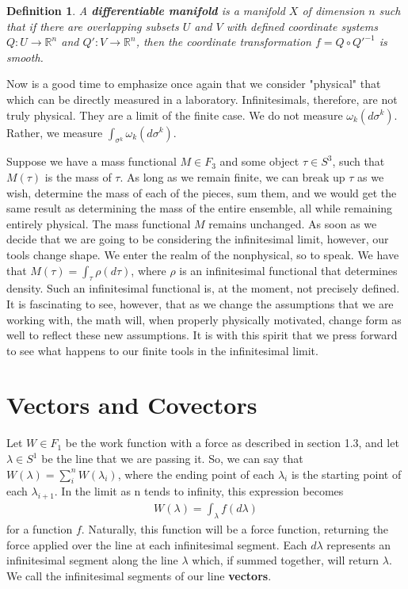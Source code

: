\documentclass{book}
\newtheorem{defn}[equation]{Definition}
\begin{document}
\begin{defn}
	A \textbf{differentiable manifold} is a manifold $X$ of dimension $n$ such that if there are overlapping subsets $U$ and $V$ with defined coordinate systems $Q: U \to \mathbb{R}^n$ and $Q': V \to \mathbb{R}^n$, then the coordinate transformation $f = Q \circ Q'^{-1}$ is smooth. 
\end{defn}

Now is a good time to emphasize once again that we consider "physical" that which can be directly measured in a laboratory. Infinitesimals, therefore, are not truly physical. They are a limit of the finite case. We do not measure $\omega_k(d\sigma^k)$. Rather, we measure $\int_{\sigma^k}\omega_k(d\sigma^k)$. 

Suppose we have a mass functional $M \in F_3$ and some object $\tau \in S^3$, such that $M(\tau)$ is the mass of $\tau$.  As long as we remain finite, we can break up $\tau$ as we wish, determine the mass of each of the pieces, sum them, and we would get the same result as determining the mass of the entire ensemble, all while remaining entirely physical. The mass functional $M$ remains unchanged. As soon as we decide that we are going to be considering the infinitesimal limit, however, our tools change shape. We enter the realm of the nonphysical, so to speak. We have that $M(\tau) = \int_\tau \rho(d\tau)$, where $\rho$ is an infinitesimal functional that determines density. Such an infinitesimal functional is, at the moment, not precisely defined. It is fascinating to see, however, that as we change the assumptions that we are working with, the math will, when properly physically motivated, change form as well to reflect these new assumptions. It is with this spirit that we press forward to see what happens to our finite tools in the infinitesimal limit. 



\section{Vectors and Covectors}



Let $W \in F_1$ be the work function with a force as described in section 1.3, and let $\lambda \in S^1$ be the line that we are passing it. So, we can say that $W(\lambda) = \sum^n_iW(\lambda_i)$, where the ending point of each $\lambda_i$ is the starting point of each $\lambda_{i+1}$. In the limit as n tends to infinity, this expression becomes \begin{gather}W(\lambda) = \int_{\lambda} f(d\lambda) \end{gather}for a function $f$. Naturally, this function will be a force function, returning the force applied over the line at each infinitesimal segment. Each $d\lambda$ represents an infinitesimal segment along the line $\lambda$ which, if summed together, will return $\lambda$. We call the infinitesimal segments of our line \textbf{vectors}. 
\end{document}
